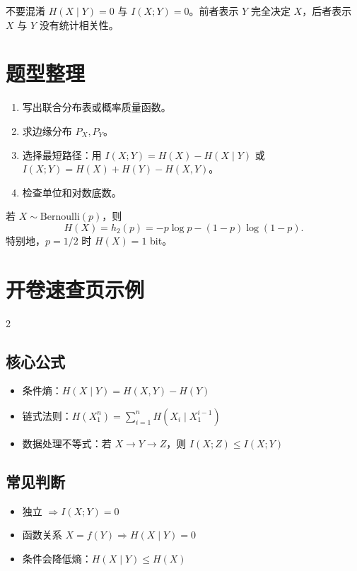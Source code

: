 \documentclass{notes}
\begin{document}
\begin{warningBox}
不要混淆 $H(X\mid Y)=0$ 与 $I(X;Y)=0$。前者表示 $Y$ 完全决定 $X$，后者表示 $X$ 与 $Y$ 没有统计相关性。
\end{warningBox}

\section{题型整理}

\begin{methodBox}[title={计算熵和互信息的步骤}]
\begin{enumerate}
  \item 写出联合分布表或概率质量函数。
  \item 求边缘分布 $P_X, P_Y$。
  \item 选择最短路径：用 $I(X;Y)=H(X)-H(X\mid Y)$ 或 $I(X;Y)=H(X)+H(Y)-H(X,Y)$。
  \item 检查单位和对数底数。
\end{enumerate}
\end{methodBox}

\begin{example}
若 $X\sim\mathrm{Bernoulli}(p)$，则
\[
  H(X)=h_2(p)=-p\log p-(1-p)\log(1-p).
\]
特别地，$p=1/2$ 时 $H(X)=1$ bit。
\end{example}

\section{开卷速查页示例}

\begin{multicols}{2}
\subsection*{核心公式}
\begin{itemize}
  \item 条件熵：$H(X\mid Y)=H(X,Y)-H(Y)$
  \item 链式法则：$H(X_1^n)=\sum_{i=1}^n H(X_i\mid X_1^{i-1})$
  \item 数据处理不等式：若 $X\to Y\to Z$，则 $I(X;Z)\le I(X;Y)$
\end{itemize}

\subsection*{常见判断}
\begin{itemize}
  \item 独立 $\Rightarrow I(X;Y)=0$
  \item 函数关系 $X=f(Y) \Rightarrow H(X\mid Y)=0$
  \item 条件会降低熵：$H(X\mid Y)\le H(X)$
\end{itemize}
\end{multicols}
\end{document}
